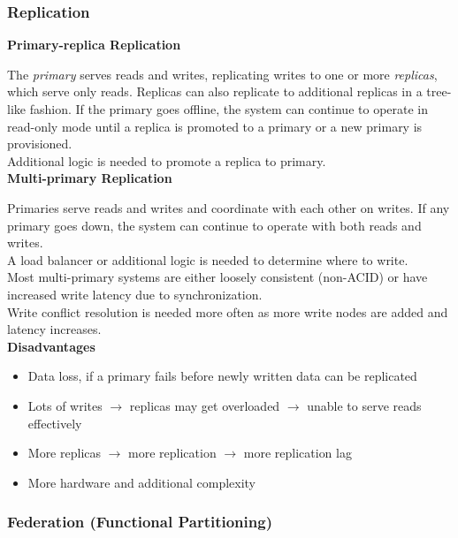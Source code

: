 \documentclass[12pt, titlepage]{article}
\begin{document}
\subsubsection{Replication}

\textbf{Primary-replica Replication} \medskip

The \textit{primary} serves reads and writes, replicating writes to one or more \textit{replicas}, which serve only reads. Replicas can also replicate to additional replicas in a tree-like fashion. If the primary goes offline, the system can continue to operate in read-only mode until a replica is promoted to a primary or a new primary is provisioned. \\

Additional logic is needed to promote a replica to primary. \\

\textbf{Multi-primary Replication} \medskip

Primaries serve reads and writes and coordinate with each other on writes. If any primary goes down, the system can continue to operate with both reads and writes. \\

A load balancer or additional logic is needed to determine where to write. \\

Most multi-primary systems are either loosely consistent (non-ACID) or have increased write latency due to synchronization. \\

Write conflict resolution is needed more often as more write nodes are added and latency increases. \\

\textbf{Disadvantages}
\begin{itemize}
  \item Data loss, if a primary fails before newly written data can be replicated
  \item Lots of writes $\rightarrow$ replicas may get overloaded $\rightarrow$ unable to serve reads effectively
  \item More replicas $\rightarrow$ more replication $\rightarrow$ more replication lag
  \item More hardware and additional complexity
\end{itemize}

\subsubsection{Federation (Functional Partitioning)}
\end{document}
